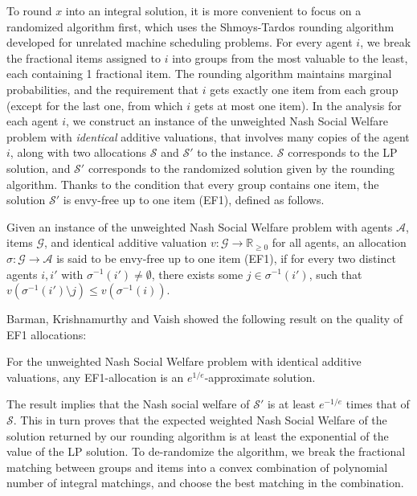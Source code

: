 \documentclass{theoretics}
\newcommand\calS{{\mathcal{S}}}
\newcommand\calA{{\mathcal{A}}}
\newcommand\calG{{\mathcal{G}}}
\newcommand{\R}{{\mathbb{R}}}
\begin{document}
To round $x$ into an integral solution, it is more convenient to focus on a randomized algorithm first, which uses the Shmoys-Tardos rounding algorithm \cite{ST93} developed for unrelated machine scheduling problems. 
For every agent $i$, we break the fractional items assigned to $i$ into groups from the most valuable to the least, each containing 1 fractional item. The rounding algorithm maintains marginal probabilities, and the requirement that $i$ gets exactly one item from each group (except for the last one, from which $i$ gets at most one item).  In the analysis for each agent $i$, we construct an instance of the unweighted Nash Social Welfare problem with \emph{identical} additive valuations, that involves many copies of the agent $i$, along with two allocations $\calS$ and $\calS'$ to the instance. $\calS$ corresponds to the LP solution, and $\calS'$ corresponds to the randomized solution given by the rounding algorithm. Thanks to the condition that every group contains one item, the solution $\calS'$ is envy-free up to one item (EF1), defined as follows.
    \begin{definition}
        Given an instance of the unweighted Nash Social Welfare problem with agents $\calA$, items $\calG$, and identical additive valuation $v: \calG \to \R_{\geq 0}$ for all agents, an allocation $\sigma: \calG \to \calA$ is said to be envy-free up to one item (EF1),  if for every two distinct agents $i, i'$ with $\sigma^{-1}(i') \neq \emptyset$, there exists some $j \in \sigma^{-1}(i')$, such that $v(\sigma^{-1}(i') \setminus j) \leq v(\sigma^{-1}(i))$.
    \end{definition}

Barman, Krishnamurthy and Vaish \cite{BKV18} showed the following result on the quality of EF1 allocations:
    \begin{theorem}
        \label{thm:EF1}
        For the unweighted Nash Social Welfare problem with identical additive valuations, any EF1-allocation is an $e^{1/e}$-approximate solution. 
    \end{theorem} %

The result implies that the Nash social welfare of $\calS'$ is at least $e^{-1/e}$ times that of $\calS$. This in turn proves that the expected weighted Nash Social Welfare of the solution returned by our rounding algorithm is at least the exponential of the value of the LP solution.  To de-randomize the algorithm, we break the fractional matching between groups and items into a convex combination of polynomial number of integral matchings, and choose the best matching in the combination. 
\end{document}

